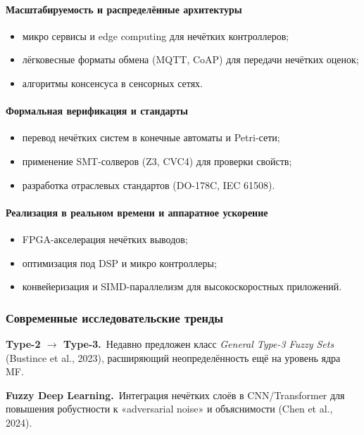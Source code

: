 \paragraph{Масштабируемость и распределённые архитектуры}
\begin{itemize}
  \item микро сервисы и edge computing для нечётких контроллеров;
  \item лёгковесные форматы обмена (MQTT, CoAP) для передачи нечётких оценок;
  \item алгоритмы консенсуса в сенсорных сетях.
\end{itemize}

\paragraph{Формальная верификация и стандарты}
\begin{itemize}
  \item перевод нечётких систем в конечные автоматы и Petri-сети;
  \item применение SMT-солверов (Z3, CVC4) для проверки свойств;
  \item разработка отраслевых стандартов (DO-178C, IEC 61508).
\end{itemize}

\paragraph{Реализация в реальном времени и аппаратное ускорение}
\begin{itemize}
  \item FPGA-акселерация нечётких выводов;
  \item оптимизация под DSP и микро контроллеры;
  \item конвейеризация и SIMD-параллелизм для высокоскоростных приложений.
\end{itemize}

\subsubsection{Современные исследовательские тренды}
\label{subsec:trends}

\textbf{Type-2 $\to$ Type-3.}\,
Недавно предложен класс \emph{General Type-3 Fuzzy Sets}
(Bustince et al., 2023), расширяющий неопределённость
ещё на уровень ядра MF.

\textbf{Fuzzy Deep Learning.}\,
Интеграция нечётких слоёв в CNN/Transformer
для повышения робустности к «adversarial noise»
и объяснимости
(Chen et al., 2024).


